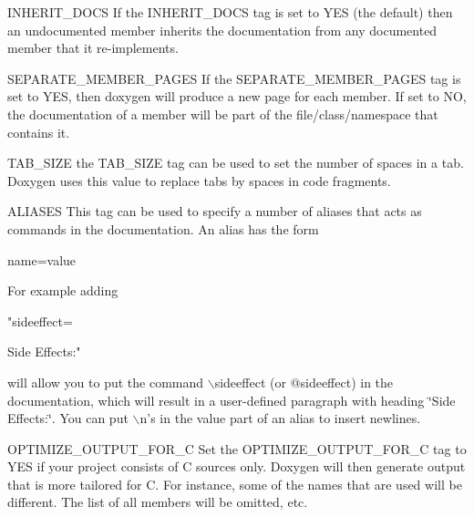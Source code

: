 \begin{DoxyDescription}
\label{config_cfg_inherit_docs}
\hypertarget{config_cfg_inherit_docs}{}
 
\item[{\ttfamily INHERIT\_\-DOCS} ] If the {\ttfamily INHERIT\_\-DOCS} tag is set to {\ttfamily YES} (the default) then an undocumented member inherits the documentation from any documented member that it re-\/implements.

\label{config_cfg_separate_member_pages}
\hypertarget{config_cfg_separate_member_pages}{}
 
\item[{\ttfamily SEPARATE\_\-MEMBER\_\-PAGES} ] If the {\ttfamily SEPARATE\_\-MEMBER\_\-PAGES} tag is set to {\ttfamily YES}, then doxygen will produce a new page for each member. If set to {\ttfamily NO}, the documentation of a member will be part of the file/class/namespace that contains it.

\label{config_cfg_tab_size}
\hypertarget{config_cfg_tab_size}{}
 
\item[{\ttfamily TAB\_\-SIZE} ] the {\ttfamily TAB\_\-SIZE} tag can be used to set the number of spaces in a tab. Doxygen uses this value to replace tabs by spaces in code fragments.

\label{config_cfg_aliases}
\hypertarget{config_cfg_aliases}{}
 
\item[{\ttfamily ALIASES} ] This tag can be used to specify a number of aliases that acts as commands in the documentation. An alias has the form \begin{DoxyVerb}
 name=value
\end{DoxyVerb}
 For example adding \begin{DoxyVerb}
 "sideeffect=\par Side Effects:\n" 
\end{DoxyVerb}
 will allow you to put the command $\backslash$sideeffect (or @sideeffect) in the documentation, which will result in a user-\/defined paragraph with heading \char`\"{}Side Effects:\char`\"{}. You can put $\backslash$n's in the value part of an alias to insert newlines.

\label{config_cfg_optimize_output_for_c}
\hypertarget{config_cfg_optimize_output_for_c}{}
 
\item[{\ttfamily OPTIMIZE\_\-OUTPUT\_\-FOR\_\-C} ] Set the {\ttfamily OPTIMIZE\_\-OUTPUT\_\-FOR\_\-C} tag to {\ttfamily YES} if your project consists of C sources only. Doxygen will then generate output that is more tailored for C. For instance, some of the names that are used will be different. The list of all members will be omitted, etc.


\end{DoxyDescription}
